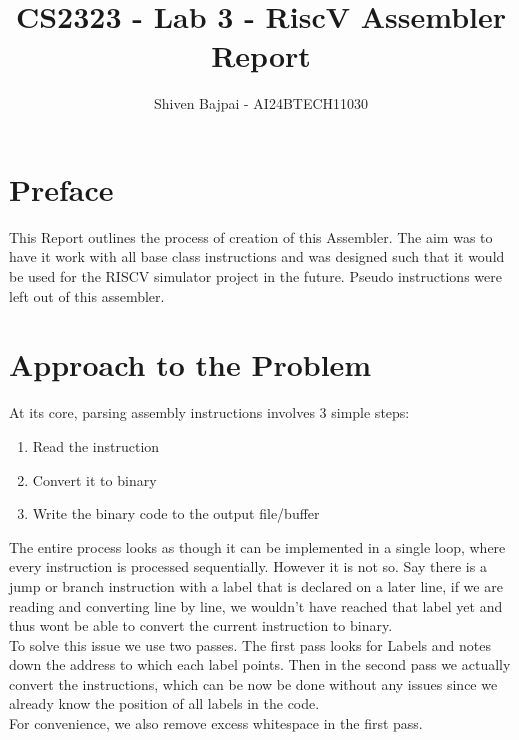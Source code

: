 \documentclass[12pt]{article}
\begin{document}
	
	\vspace{3cm}

	\title{CS2323 - Lab 3 - RiscV Assembler Report}
	\author{Shiven Bajpai - AI24BTECH11030}

	\maketitle
	\bigskip

	\renewcommand{\thefigure}{\theenumi}
	\renewcommand{\thetable}{\theenumi}

	\tableofcontents

	\newpage

	\section{Preface}
	This Report outlines the process of creation of this Assembler. The aim was to have it work with all base class instructions and was designed such that it would be used for the RISCV simulator project in the future. 
	Pseudo instructions were left out of this assembler.

	\section{Approach to the Problem}
	At its core, parsing assembly instructions involves 3 simple steps:\\

	\begin{enumerate}
		\item{Read the instruction}
		\item{Convert it to binary}
		\item{Write the binary code to the output file/buffer\\}
	\end{enumerate}

	The entire process looks as though it can be implemented in a single loop, where every instruction is processed sequentially. However it is not so. Say there is a jump or branch instruction with a label that is declared on a later line, if we are reading and converting line by line, we wouldn't have reached that label yet and thus wont be able to convert the current instruction to binary.\\
	To solve this issue we use two passes. The first pass looks for Labels and notes down the address to which each label points. Then in the second pass we actually convert the instructions, which can be now be done without any issues since we already know the position of all labels in the code.\\
	For convenience, we also remove excess whitespace in the first pass.\\\\
\end{document}
